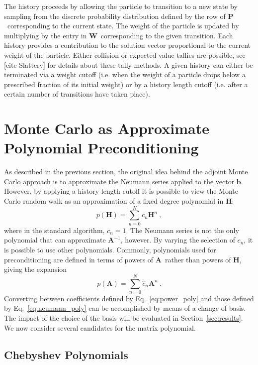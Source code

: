 \documentclass[10pt]{article}
\newcommand{\bb}{\ensuremath{\mathbf{b}}}
\newcommand{\bA}{\ensuremath{\mathbf{A}}}
\newcommand{\bH}{\ensuremath{\mathbf{H}}}
\newcommand{\bP}{\ensuremath{\mathbf{P}}}
\newcommand{\bW}{\ensuremath{\mathbf{W}}}
\begin{document}
The history proceeds by allowing the particle to transition
to a new state by sampling from the discrete probability distribution
defined by the row of \bP\ corresponding to the current state.
The weight of the particle is updated by multiplying by the
entry in \bW\ corresponding to the given transition.
Each history provides a contribution to the solution vector proportional
to the current weight of the particle.  Either collision or
expected value tallies are possible, see [cite Slattery] for details
about these tally methods.
A given history can either be terminated via a weight cutoff (i.e.
when the weight of a particle drops below a prescribed fraction
of its initial weight) or by a history length cutoff (i.e. after
a certain number of transitions have taken place).

\section{Monte Carlo as Approximate Polynomial Preconditioning}
\label{sec:polynomial_prec}

As described in the previous section, the original idea behind
the adjoint Monte Carlo approach is to approximate the
Neumann series applied to the vector \bb.
However, by applying a history length cutoff it is possible to
view the Monte Carlo random walk as an approximation of a
fixed degree polynomial in $\bH$:
\begin{equation}
p(\bH) = \sum_{n=0}^{N} c_n \bH^n \:, \label{eq:neumann_poly}
\end{equation}
where in the standard algorithm, $c_n=1$.
The Neumann series is not the only polynomial that can approximate
$\bA^{-1}$, however.  By varying the selection of $c_n$, it is
possible to use other polynomials.  Commonly, polynomials used
for preconditioning are defined in terms of powers of \bA\ rather
than powers of \bH, giving the expansion
\begin{equation}
p(\bA) = \sum_{n=0}^{N} \hat{c}_n \bA^n \:. \label{eq:power_poly}
\end{equation}
Converting between coefficients defined by Eq.~\eqref{eq:power_poly}
and those defined by Eq.~\eqref{eq:neumann_poly} can be
accomplished by means of a change of basis.  The impact of the
choice of the basis will be evaluated in Section~\ref{sec:results}.
We now consider several candidates for the matrix polynomial.

\subsection{Chebyshev Polynomials}
\label{subsec:chebyshev}
\end{document}
